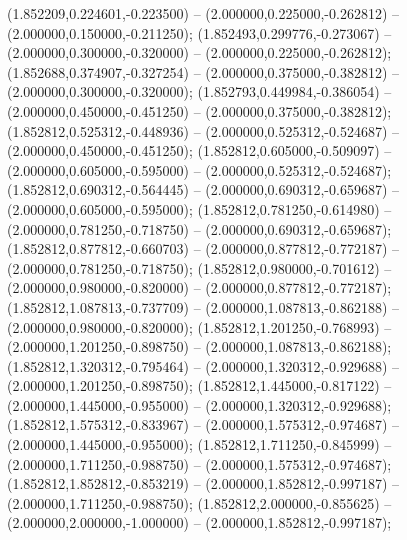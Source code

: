  (1.852209,0.224601,-0.223500) -- (2.000000,0.225000,-0.262812) -- (2.000000,0.150000,-0.211250);
 (1.852493,0.299776,-0.273067) -- (2.000000,0.300000,-0.320000) -- (2.000000,0.225000,-0.262812);
 (1.852688,0.374907,-0.327254) -- (2.000000,0.375000,-0.382812) -- (2.000000,0.300000,-0.320000);
 (1.852793,0.449984,-0.386054) -- (2.000000,0.450000,-0.451250) -- (2.000000,0.375000,-0.382812);
 (1.852812,0.525312,-0.448936) -- (2.000000,0.525312,-0.524687) -- (2.000000,0.450000,-0.451250);
 (1.852812,0.605000,-0.509097) -- (2.000000,0.605000,-0.595000) -- (2.000000,0.525312,-0.524687);
 (1.852812,0.690312,-0.564445) -- (2.000000,0.690312,-0.659687) -- (2.000000,0.605000,-0.595000);
 (1.852812,0.781250,-0.614980) -- (2.000000,0.781250,-0.718750) -- (2.000000,0.690312,-0.659687);
 (1.852812,0.877812,-0.660703) -- (2.000000,0.877812,-0.772187) -- (2.000000,0.781250,-0.718750);
 (1.852812,0.980000,-0.701612) -- (2.000000,0.980000,-0.820000) -- (2.000000,0.877812,-0.772187);
 (1.852812,1.087813,-0.737709) -- (2.000000,1.087813,-0.862188) -- (2.000000,0.980000,-0.820000);
 (1.852812,1.201250,-0.768993) -- (2.000000,1.201250,-0.898750) -- (2.000000,1.087813,-0.862188);
 (1.852812,1.320312,-0.795464) -- (2.000000,1.320312,-0.929688) -- (2.000000,1.201250,-0.898750);
 (1.852812,1.445000,-0.817122) -- (2.000000,1.445000,-0.955000) -- (2.000000,1.320312,-0.929688);
 (1.852812,1.575312,-0.833967) -- (2.000000,1.575312,-0.974687) -- (2.000000,1.445000,-0.955000);
 (1.852812,1.711250,-0.845999) -- (2.000000,1.711250,-0.988750) -- (2.000000,1.575312,-0.974687);
 (1.852812,1.852812,-0.853219) -- (2.000000,1.852812,-0.997187) -- (2.000000,1.711250,-0.988750);
 (1.852812,2.000000,-0.855625) -- (2.000000,2.000000,-1.000000) -- (2.000000,1.852812,-0.997187);
